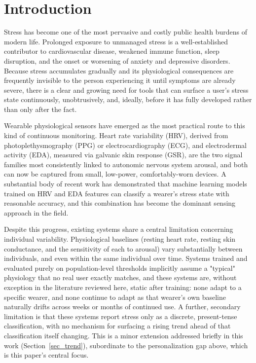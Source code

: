 \documentclass[conference]{IEEEtran}
\begin{document}
\section{Introduction}

Stress has become one of the most pervasive and costly
public health burdens of modern life. Prolonged exposure to
unmanaged stress is a well-established contributor to
cardiovascular disease, weakened immune function, sleep
disruption, and the onset or worsening of anxiety and
depressive disorders. Because stress accumulates gradually
and its physiological consequences are frequently invisible
to the person experiencing it until symptoms are already
severe, there is a clear and growing need for tools that can
surface a user's stress state continuously, unobtrusively,
and, ideally, before it has fully developed rather than only
after the fact.

Wearable physiological sensors have emerged as the most
practical route to this kind of continuous monitoring.
Heart rate variability (HRV), derived from photoplethysmography
(PPG) or electrocardiography (ECG), and electrodermal
activity (EDA), measured via galvanic skin response (GSR),
are the two signal families most consistently linked to
autonomic nervous system arousal, and both can now be
captured from small, low-power, comfortably-worn devices.
A substantial body of recent work has demonstrated that
machine learning models trained on HRV and EDA features can
classify a wearer's stress state with reasonable accuracy,
and this combination has become the dominant sensing
approach in the field.

Despite this progress, existing systems share a central
limitation concerning individual variability. Physiological
baselines (resting heart rate, resting skin conductance, and
the sensitivity of each to arousal) vary substantially between
individuals, and even within the same individual over time.
Systems trained and evaluated purely on population-level
thresholds implicitly assume a "typical" physiology that no
real user exactly matches, and these systems are, without
exception in the literature reviewed here, static after
training: none adapt to a specific wearer, and none continue
to adapt as that wearer's own baseline naturally drifts across
weeks or months of continued use. A further, secondary
limitation is that these systems report stress only as a
discrete, present-tense classification, with no mechanism for
surfacing a rising trend ahead of that classification itself
changing. This is a minor extension addressed briefly in this
work (Section~\ref{sec_trend}), subordinate to the
personalization gap above, which is this paper's central
focus.
\end{document}
